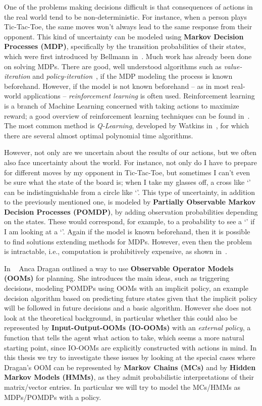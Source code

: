 \documentclass{article}
\theoremstyle{definition}
\def\ticX{\text{${\times}$}}
\def\ticO{\text{\small{\textcircled{ }}}}
\begin{document}
One of the problems making decisions difficult is that consequences of actions in the real
world tend to be non-deterministic. For instance, when a person plays Tic-Tac-Toe, the same
moves won't always lead to the same response from their opponent. This kind of uncertainty
can be modeled using {\bf{Markov Decision Processes (MDP)}}, specifically by the transition
probabilities of their states, which were first introduced by Bellmann in~\cite{MDP}. Much
work has already been done on solving MDPs. There are good, well understood
algorithms such as {\emph{value-iteration}} and {\emph{policy-iteration}}~\cite{4curr}, if the MDP modeling
the process is known beforehand. However, if the model is not known beforehand -- as in
most real-world applications -- {\emph{reinforcement learning}} is often used. Reinforcement
learning is a branch of Machine Learning concerned with taking actions to maximize reward;
a good overview of reinforcement learning techniques can be found in~\cite{Kae4}. The most
common method is {\emph{Q-Learning}}, developed by Watkins in~\cite{Qlearn}, for which there are
several almost optimal polynomial time algorithms.

However, not only are we uncertain 
about the results of our actions, but we often also face uncertainty about the world. For instance, not
only do I have to prepare for different moves by my opponent in Tic-Tac-Toe, but sometimes I can't even be sure what the state of the board is; when
I take my glasses off, a cross like `{\ticX}' can be indistinguishable from a circle like `{\ticO}'. This type of uncertainty, in
addition to the previously mentioned one, is modeled by {\bf{Partially Observable Markov
Decision Processes (POMDP)}}, by adding observation probabilities depending on the
states. These would correspond, for example, to a probability to see a `{\ticX}' if I am
looking at a `{\ticO}'. Again if the model is known beforehand, then it is possible to find
solutions extending methods for MDPs. However, even then the problem is intractable,
i.e., computation is prohibitively expensive, as shown in~\cite{MDPcomplex}. 


In ~\cite{Anca} Anca Dragan outlined a way to use {\bf{Observable Operator Models (OOMs)}} \cite{OOM1} for planning. She introduces the main ideas, such as triggering decisions, modeling POMDPs using OOMs with an implicit policy, an example decision algorithm based on predicting future states given that the implicit policy will be followed in future decisions and a basic algorithm. However she does not look at the theoretical background, in particular whether this could also be represented by {\bf{Input-Output-OOMs (IO-OOMs)}} with an {\emph{external policy}}, a function that tells the agent what action to take, which seems a more natural starting point, since IO-OOMs are explicitly constructed with actions in mind. In this thesis we try to investigate these issues by looking at the special cases where Dragan's OOM can be represented by {\bf{Markov Chains (MCs)}} and by {\bf{Hidden Markov Models (HMMs)}}, as they admit probabilistic interpretations of their matrix/vector entries. In particular we will try to model the MCs/HMMs as MDPs/POMDPs with a policy.
\end{document}
